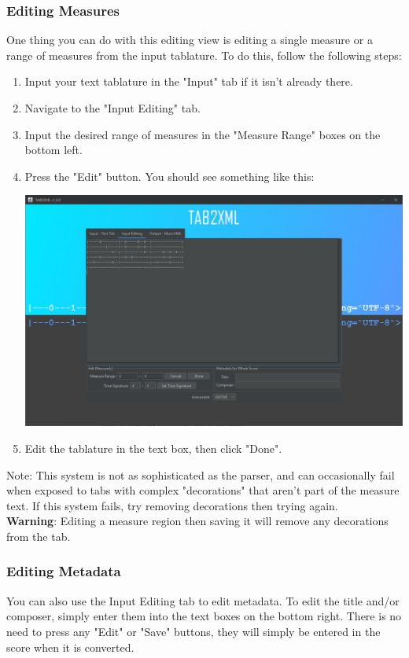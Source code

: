 \documentclass[11pt]{article}
\begin{document}
\subsubsection{Editing Measures}
\label{sec:org22b80ff}
One thing you can do with this editing view is editing a single measure or a range of measures from the input tablature.  To do this, follow the following steps:
\begin{enumerate}
\item Input your text tablature in the "Input" tab if it isn't already there.
\item Navigate to the "Input Editing" tab.
\item Input the desired range of measures in the "Measure Range" boxes on the bottom left.
\item Press the "Edit" button.  You should see something like this:
\begin{center}
\includegraphics[width=.9\linewidth]{../Screenshots/sample-input-editing-tabbedview.png}
\end{center}
\item Edit the tablature in the text box, then click "Done".
\end{enumerate}

Note: This system is not as sophisticated as the parser, and can occasionally fail when exposed to tabs with complex "decorations" that aren't part of the measure text.  If this system fails, try removing decorations then trying again. \\
\textbf{Warning}: Editing a measure region then saving it will remove any decorations from the tab.
\subsubsection{Editing Metadata}
\label{sec:orga566ee2}
You can also use the Input Editing tab to edit metadata.  To edit the title and/or composer, simply enter them into the text boxes on the bottom right.  There is no need to press any "Edit" or "Save" buttons, they will simply be entered in the score when it is converted.
\end{document}
